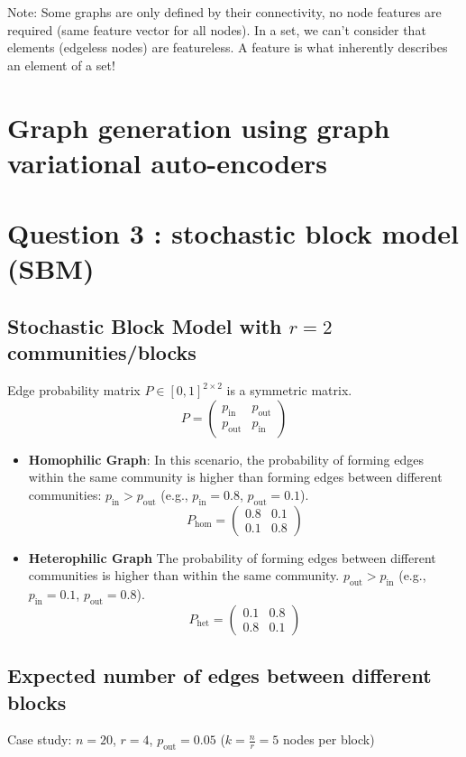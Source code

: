 \documentclass[a4paper]{article}
\begin{document}
Note: Some graphs are only defined by their connectivity, no node features are required (same feature vector for all nodes). In a set, we can't consider that elements (edgeless nodes) are featureless. A feature is what inherently describes an element of a set! 

\break
\section{Graph generation using graph variational auto-encoders}
\section*{Question 3 : stochastic block model (SBM)}
\subsection*{Stochastic Block Model with $r=2$ communities/blocks}
Edge probability matrix $ P \in {[0, 1]}^{2\times 2}$ is a symmetric matrix.
\[ P = \begin{pmatrix} p_{\text{in}} &  p_{\text{out}} \\ p_{\text{out}} &  p_{\text{in}} \end{pmatrix} \]

\begin{itemize}
    \item \textbf{Homophilic Graph}: In this scenario, the probability of forming edges within the same community is higher than forming edges between different communities: $ p_\text{in} > p_{\text{out}}$
    (e.g., \( p_\text{in} = 0.8 \), \( p_\text{out} = 0.1 \)).
    \[ P_{\text{hom}} = \begin{pmatrix} 0.8 & 0.1 \\ 0.1 & 0.8 \end{pmatrix} \]
    \item \textbf{Heterophilic Graph} The probability of forming edges between different communities is higher than within the same community.  $ p_\text{out} > p_{\text{in}}$
    (e.g., \( p_\text{in} = 0.1 \), \( p_\text{out} = 0.8 \)).
    \[ P_{\text{het}} = \begin{pmatrix} 0.1 & 0.8 \\ 0.8 & 0.1 \end{pmatrix} \]
\end{itemize}


\subsection*{Expected number of edges between different blocks}
Case study: $n=20$, $r=4$, $p_{\text{out}}=0.05$  ($k=\frac{n}{r}=5$ nodes per block)
\end{document}
